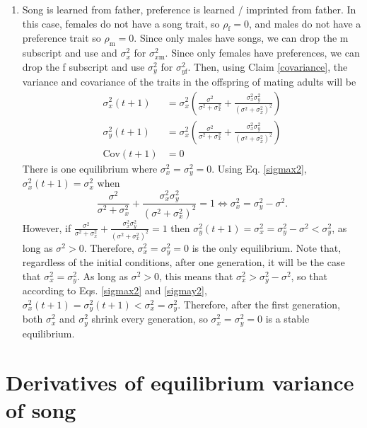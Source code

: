 \documentclass{article}
\newcommand{\x}[1]{\text{#1}}
\newcommand{\Cov}{\text{Cov}}
\begin{document}
\begin{enumerate}
\item Song is learned from father, preference is learned / imprinted from father.  In this case, females do not have a song trait, so $\rho_\x{f}=0$, and males do not have a preference trait so $\rho_\x{m}=0$. Since only males have songs, we can drop the m subscript and use and $\sigma_x^2$ for $\sigma_{x\x{m}}^2$. Since only females have preferences, we can drop the f subscript and use $\sigma_y^2$ for $\sigma_{y\x{f}}^2$. Then, using Claim \ref{covariance}, the variance and covariance of the traits in the offspring of mating adults will be 
\begin{align}
\sigma_x^2(t+1)&=\sigma_x^2\left(\frac{\sigma^2}{\sigma^2+\sigma_x^2}+\frac{\sigma_x^2\sigma_y^2}{(\sigma^2+\sigma_x^2)^2}\right) \label{sigmax2}
\\ \sigma_y^2(t+1)&=\sigma_x^2\left(\frac{\sigma^2}{\sigma^2+\sigma_x^2}+\frac{\sigma_x^2\sigma_y^2}{(\sigma^2+\sigma_x^2)^2}\right) \label{sigmay2}
\\ \Cov(t+1)&=0
\end{align}
There is one equilibrium where $\sigma_x^2=\sigma_y^2=0$. Using Eq. \ref{sigmax2}, 
$\sigma_x^2(t+1)=\sigma_x^2$ when $$ \frac{\sigma^2}{\sigma^2+\sigma_x^2}+\frac{\sigma_x^2\sigma_y^2}{(\sigma^2+\sigma_x^2)^2}=1 \Leftrightarrow \sigma_x^2=\sigma_y^2-\sigma^2.$$ However, if $\frac{\sigma^2}{\sigma^2+\sigma_x^2}+\frac{\sigma_x^2\sigma_y^2}{(\sigma^2+\sigma_x^2)^2}=1$ then $\sigma_y^2(t+1)=\sigma_x^2=\sigma_y^2-\sigma^2<\sigma_y^2$, as long as $\sigma^2>0$. Therefore, $\sigma_x^2=\sigma_y^2=0$ is the only equilibrium. Note that, regardless of the initial conditions, after one generation, it will be the case that $\sigma_x^2=\sigma_y^2$. As long as $\sigma^2>0$, this means that $\sigma_x^2>\sigma_y^2-\sigma^2$, so that according to Eqs. \ref{sigmax2} and \ref{sigmay2}, $\sigma_x^2(t+1)=\sigma_y^2(t+1)<\sigma_x^2=\sigma_y^2$. Therefore, after the first generation, both $\sigma_x^2$ and $\sigma_y^2$ shrink every generation, so $\sigma_x^2=\sigma_y^2=0$ is a stable equilibrium.

\end{enumerate}

\section{Derivatives of equilibrium variance of song \label{sigmax2_derivatives}}
\end{document}
